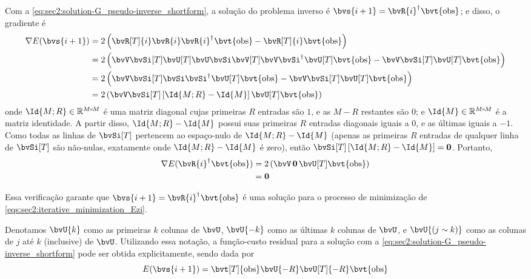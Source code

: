 Com a \cref{eq:sec2:solution-G_pseudo-inverse_shortform}, a solução do problema inverso é $\bvs{i+1} = \pinv{\bvR{i}} \bvt{\obs}$; e disso, o gradiente é
\begin{equation}
	\begin{split}
		\nabla E(\bvs{i+1})
		& = 2\pts{\bvR[T]{i} \bvR{i} \pinv{\bvR{i}} \bvt{\obs} - \bvR[T]{i} \bvt{\obs}} \\
		& = 2\pts{\bvV \bvSi[T] \bvU[T] \bvU \bvSi \bvV[T] \bvV \pinv{\bvSi} \bvU[T] \bvt{\obs} - \bvV \bvSi[T] \bvU[T] \bvt{\obs}} \\
		& = 2\pts{\bvV \bvSi[T] \bvSi \pinv{\bvSi} \bvU[T] \bvt{\obs} - \bvV \bvSi[T] \bvU[T] \bvt{\obs}} \\
		& = 2\pts{\bvV \bvSi[T] \bts{\Id{M;R} - \Id{M}} \bvU[T] \bvt{\obs}}
	\end{split}
\end{equation}
onde $\Id{M;R} \in \re^{\sz{M}{M}}$ é uma matriz diagonal cujas primeiras $R$ entradas são $1$, e as $M-R$ restantes são $0$; e $\Id{M} \in \re^{\sz{M}{M}}$ é a matriz identidade. A partir disso, $\Id{M;R} - \Id{M}$ possui suas primeiras $R$ entradas diagonais iguais a $0$, e as últimas iguais a $-1$. Como todas as linhas de $\bvSi[T]$ pertencem ao espaço-nulo de $\Id{M;R} - \Id{M}$ (apenas as primeiras $R$ entradas de qualquer linha de $\bvSi[T]$ são não-nulas, exatamente onde $\Id{M;R} - \Id{M}$ é zero), então $\bvSi[T]\bts{\Id{M;R} - \Id{M}} = \bv0$. Portanto,
\begin{equation}
	\begin{split}
		\nabla E(\pinv{\bvR{i}} \bvt{\obs})
		& = 2\pts{\bvV \,\bv0\, \bvU[T] \bvt{\obs}} \\
		& = \bv0
	\end{split}
\end{equation}

Essa verificação garante que $\bvs{i+1} = \pinv{\bvR{i}} \bvt{\obs}$ é uma solução para o processo de minimização de \cref{eqs:sec2:iterative_minimization_Ezi}.

Denotamos $\bvU{k}$ como as primeiras $k$ colunas de $\bvU$, $\bvU{-k}$ como as últimas $k$ colunas de $\bvU$, e $\bvU{(j\sim k)}$ como as colunas de $j$ até $k$ (inclusive) de $\bvU$. Utilizando essa notação, a função-custo residual para a solução com a \cref{eq:sec2:solution-G_pseudo-inverse_shortform} pode ser obtida explicitamente, sendo dada por
\begin{equation}
	E(\bvs{i+1}) = \bvt[T]{\obs} \bvU{-R} \bvU[T]{-R} \bvt{\obs}
	\label{eq:sec2:cost_func_explicit_svd}
\end{equation}

